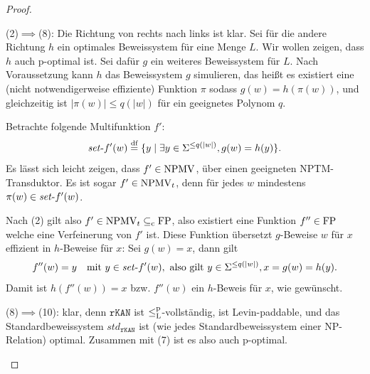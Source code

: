 \begin{proof}
\begin{prooflist}

\item (2)$\implies$(8): Die Richtung von rechts nach links ist klar. Sei für die andere Richtung $h$ ein optimales Beweissystem für eine Menge $L$. Wir wollen zeigen, dass $h$ auch p-optimal ist. Sei dafür $g$ ein weiteres Beweissystem für $L$. Nach Voraussetzung kann $h$ das Beweissystem $g$ simulieren, das heißt es existiert eine (nicht notwendigerweise effiziente) Funktion $\pi$ sodass $g(w)=h(\pi(w))$, und gleichzeitig ist $|\pi(w)|\leq q(|w|)$ für ein geeignetes Polynom $q$.

Betrachte folgende Multifunktion $f'$:
\[ \mathit{set}\text{-}{}f'(w) \stackrel{\text{df}}{=}  \{ y \mid \exists y\in\Sigma^{\leq q(|w|)}, g(w)=h(y) \}. \]
Es lässt sich leicht zeigen, dass $f'\in\mathrm{NPMV}$, über einen geeigneten NPTM-Transduktor. 
Es ist sogar $f'\in\mathrm{NPMV}_t$, denn für jedes $w$ mindestens $\pi(w)\in \mathit{set}\text{-}{}f'(w)$.

Nach (2) gilt also $f'\in\mathrm{NPMV}_t\subseteq_\mathrm{c} \mathrm{FP}$, also existiert eine Funktion $f''\in\mathrm{FP}$ welche eine Verfeinerung von $f'$ ist. Diese Funktion übersetzt $g$-Beweise $w$ für $x$ effizient in $h$-Beweise für $x$: 
Sei $g(w)=x$, dann gilt
\[ f''(w) = y \quad\text{mit } y\in\mathit{set}\text{-}{}f'(w), \text{ also gilt } y\in\Sigma^{\leq q(|w|)}, x=g(w)=h(y). \]
Damit ist $h(f''(w))=x$ bzw. $f''(w)$ ein $h$-Beweis für $x$, wie gewünscht.


\item (8)$\implies$(10): klar, denn $\mathtt{rKAN}$ ist $\leq_\mathrm{L}^\mathrm{p}$-vollständig, ist Levin-paddable, und das Standardbeweissystem $\mathit{std}_\mathtt{rKAN}$ ist (wie jedes Standardbeweissystem einer NP-Relation) optimal. Zusammen mit (7) ist es also auch p-optimal.
\end{prooflist}
\end{proof}

